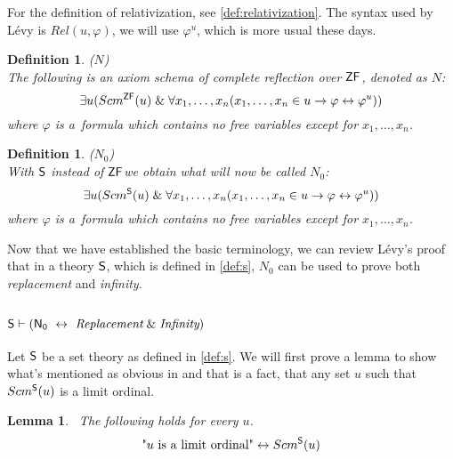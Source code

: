 \documentclass[12pt,a4paper]{article}
\newtheorem{definition}[theorem]{Definition}
\newtheorem{lemma}[theorem]{Lemma}
\renewcommand{\iff}{\leftrightarrow}
\newcommand{\then}{\rightarrow}
\newcommand{\et}{\mathrel{\&}}
\begin{document}
For the definition of relativization, see \ref{def:relativization}. The syntax used by Lévy is $Rel(u, \varphi)$, we will use $\varphi^{u}$, which is more usual these days.
\begin{definition}{($N$)}\label{def:levy_axiom_n}\\
The following is an axiom schema of complete reflection over $\sf{ZF}$, denoted as $N$:
\begin{equation}
\exists u (Scm^{\sf{ZF}}(u) \et \forall x_1, \ldots , x_n (x_1, \ldots , x_n \in u \then \varphi \iff \varphi^{u}))
\end{equation}
where $\varphi$ is a~formula which contains no free variables except for $x_1, \ldots , x_n$.
\end{definition}

\begin{definition}{($N_0$)}\label{def:levy_axiom_n0}\\
With $\sf{S}$ instead of $\sf{ZF}$we obtain what will now be called $N_0$:
\begin{equation}
\exists u (Scm^{\sf{S}}(u) \et \forall x_1, \ldots , x_n (x_1, \ldots , x_n \in u \then \varphi \iff \varphi^{u}))
\end{equation}
where $\varphi$ is a~formula which contains no free variables except for $x_1, \ldots , x_n$.
\end{definition}

Now that we have established the basic terminology, we can review Lévy's proof that in a theory $\sf{S}$, which is defined in \ref{def:s}, $N_0$ can be used to prove both \emph{replacement} and \emph{infinity}.

\subsection{$\sf{S} \vdash (N_0\ \iff\ \emph{Replacement} \et \emph{Infinity})$} 

Let $\sf{S}$ be a set theory as defined in \ref{def:s}. We will first prove a lemma to show what's mentioned as obvious in \cite{Levy60a} and that is a fact, that any set $u$ such that $Scm^{\sf{S}}(u)$ is a limit ordinal.
\begin{lemma}\label{lemma:scm_s_is_limit}\
The following holds for every $u$.
\begin{equation}
\mbox{"$u$ is a limit ordinal"} \iff Scm^{\sf{S}}(u)
\end{equation}
\end{lemma}
\end{document}
